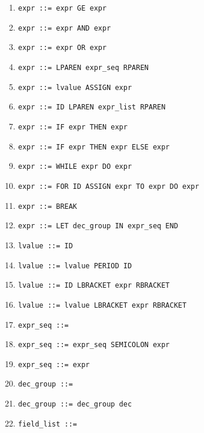 \documentclass{article}
\begin{document}
\begin{enumerate}
  \item \verb|expr ::= expr GE expr|

  \item \verb|expr ::= expr AND expr|

  \item \verb|expr ::= expr OR expr|

  \item \verb|expr ::= LPAREN expr_seq RPAREN|

  \item \verb|expr ::= lvalue ASSIGN expr|

  \item \verb|expr ::= ID LPAREN expr_list RPAREN|

  \item \verb|expr ::= IF expr THEN expr|

  \item \verb|expr ::= IF expr THEN expr ELSE expr|

  \item \verb|expr ::= WHILE expr DO expr|

  \item \verb|expr ::= FOR ID ASSIGN expr TO expr DO expr|

  \item \verb|expr ::= BREAK|

  \item \verb|expr ::= LET dec_group IN expr_seq END|

  \item \verb|lvalue ::= ID|

  \item \verb|lvalue ::= lvalue PERIOD ID|

  \item \verb|lvalue ::= ID LBRACKET expr RBRACKET|

  \item \verb|lvalue ::= lvalue LBRACKET expr RBRACKET|

  \item \verb|expr_seq ::=|

  \item \verb|expr_seq ::= expr_seq SEMICOLON expr|

  \item \verb|expr_seq ::= expr|

  \item \verb|dec_group ::=|

  \item \verb|dec_group ::= dec_group dec|

  \item \verb|field_list ::=|


\end{enumerate}
\end{document}
